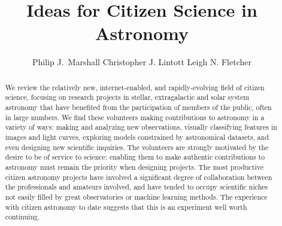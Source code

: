 \documentclass{ar2e}
\begin{document}

\jvol{}
\ARinfo{}

\title{Ideas for Citizen Science in Astronomy}

\author{%
Philip J.\ Marshall
Christopher J. Lintott
Leigh N. Fletcher
}




\begin{abstract} 

We review the relatively new, internet-enabled, and rapidly-evolving field of
citizen science, focusing on research projects in stellar, extragalactic and 
solar system astronomy that have benefited from the participation of members of
the public, often in large numbers. We find these volunteers making
contributions to astronomy in a variety of ways: making and analyzing new
observations, visually classifying features in images and light curves,
exploring models constrained by astronomical datasets, and even designing new
scientific inquiries. The volunteers are strongly motivated by the desire to be
of service to science: enabling them to make authentic contributions to
astronomy must remain the priority when designing projects.  The most productive
citizen astronomy projects have involved a significant degree of collaboration
between the professionals and amateurs involved, and have tended to occupy
scientific niches not easily filled by great observatories or machine learning
methods. The experience with citizen astronomy to date suggests that this is an
experiment well worth continuing.

\end{abstract}
\end{document}
